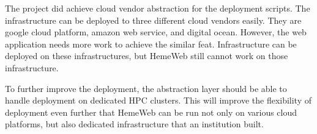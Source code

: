 \begin{enumerate}
    The project did achieve cloud vendor abstraction for the deployment scripts. The infrastructure can be deployed to three different cloud vendors easily. They are google cloud platform, amazon web service, and digital ocean. However, the web application needs more work to achieve the similar feat. Infrastructure can be deployed on these infrastructures, but HemeWeb still cannot work on those infrastructure.
    
    To further improve the deployment, the abstraction layer should be able to handle deployment on dedicated HPC clusters. This will improve the flexibility of deployment even further that HemeWeb can be run not only on various cloud platforms, but also dedicated infrastructure that an institution built.
    
\end{enumerate}

